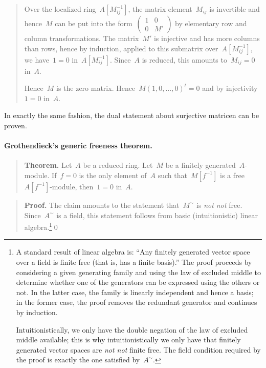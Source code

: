 \documentclass{ws-rv9x6}
\renewcommand{\_}{\mathpunct{.}}
\newcommand{\?}{\,{:}\,}
\newcommand{\notnot}{\emph{not not}\xspace}
\begin{document}
\begin{quote}
Over the localized
ring~$A[M_{ij}^{-1}]$, the matrix element~$M_{ij}$ is invertible and hence~$M$ can be
put into the form~$\left(\begin{smallmatrix}1&0\\0&M'\end{smallmatrix}\right)$
by elementary row and column transformations. The matrix~$M'$ is injective and
has more columns than rows, hence by induction, applied to this submatrix
over~$A[M_{ij}^{-1}]$, we have~$1 = 0$ in~$A[M_{ij}^{-1}]$. Since~$A$ is
reduced, this amounts to~$M_{ij} = 0$ in~$A$.

Hence~$M$ is the zero matrix. Hence~$M(1,0,\ldots,0)^t = 0$ and by
injectivity~$1 = 0$ in~$A$.
\end{quote}

In exactly the same fashion, the dual statement about surjective matricen can
be proven.

\paragraph{Grothendieck's generic freeness theorem.}

\begin{quote}
\textbf{Theorem.}
Let~$A$ be a reduced ring. Let~$M$ be a finitely generated~$A$-module.
If~$f = 0$ is the only element of~$A$ such that~$M[f^{-1}]$ is a
free~$A[f^{-1}]$-module, then~$1 = 0$ in~$A$.
\end{quote}

\begin{quote}
\textbf{Proof.} The claim amounts to the statement that~$M^\sim$ is \emph{not not}
free. Since~$A^\sim$ is a field, this statement follows from
basic (intuitionistic) linear algebra.\footnote{A standard result of linear
algebra is: ``Any finitely generated vector space over a field is finite free
(that is, has a finite basis).'' The proof proceeds by considering a given
generating family and using the law of excluded middle to determine whether one
of the generators can be expressed using the others or not. In the latter case,
the family is linearly independent and hence a basis; in the former case, the
proof removes the redundant generator and continues by induction.

Intuitionistically, we only have the double negation of the law of excluded
middle available; this is why intuitionistically we only have that finitely
generated vector spaces are \notnot finite free. The field condition required
by the proof is exactly the one satisfied by~$A^\sim$.}\qed\end{quote}
\end{document}
